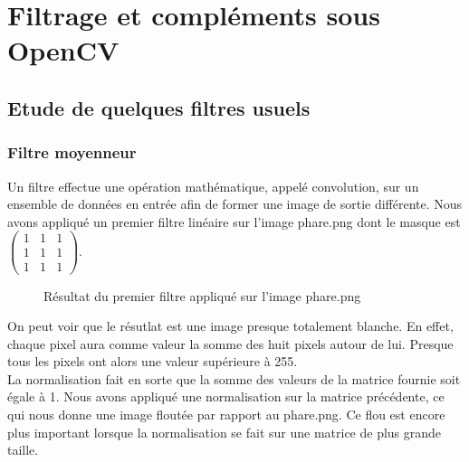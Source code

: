 \section{Filtrage et compléments sous OpenCV}

\subsection{Etude de quelques filtres usuels}

\subsubsection{Filtre moyenneur}

Un filtre effectue une opération mathématique, appelé convolution, sur un ensemble de données en entrée afin de former
une image de sortie différente. Nous avons appliqué un premier filtre linéaire sur l'image phare.png dont le masque est 
$\begin{pmatrix}
   1 & 1 & 1\\
   1 & 1 & 1\\
   1 & 1 & 1
\end{pmatrix}$.

\begin{figure}[H]
      \center
      \caption{Résultat du premier filtre appliqué sur l'image phare.png}
\end{figure}

On peut voir que le résutlat est une image presque totalement blanche. En effet, chaque pixel aura comme valeur la somme
des huit pixels autour de lui. Presque tous les pixels ont alors une valeur supérieure à 255.\\

La normalisation fait en sorte que la somme des valeurs de la matrice fournie soit égale à 1. Nous avons appliqué une normalisation sur 
la matrice précédente, ce qui nous donne une image floutée par rapport au phare.png. Ce flou est encore plus important lorsque
la normalisation se fait sur une matrice de plus grande taille.\\

